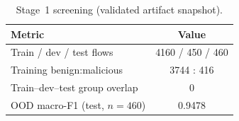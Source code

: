 \begin{table}[t]
  \centering
  \caption{Stage~1 screening (validated artifact snapshot).}
  \label{tab:exp-stage1}
  \begin{tabular}{@{}lc@{}}
    \toprule
    Metric & Value \\
    \midrule
    Train / dev / test flows & 4160 / 450 / 460 \\
    Training benign:malicious & 3744 : 416 \\
    Train--dev--test group overlap & 0 \\
    OOD macro-F1 (test, $n=460$) & 0.9478 \\
    \bottomrule
  \end{tabular}
\end{table}
